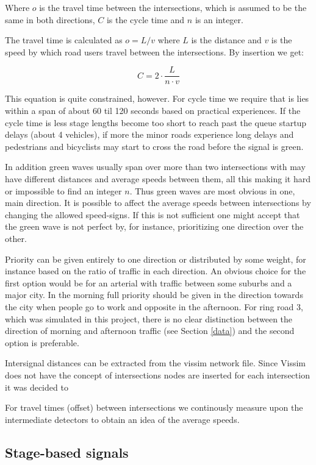 Where $o$ is the travel time between the intersections, which is assumed to be the same in both directions, $C$ is the cycle time and $n$ is an integer.

The travel time is calculated as $o = L / v$ where $L$ is the distance and $v$ is the speed by which road users travel between the intersections. By insertion we get:

$$C = 2 \cdot \frac{L}{n \cdot v}$$

This equation is quite constrained, however. For cycle time we require that is lies within a span of about 60 til 120 seconds based on practical experiences. If the cycle time is less stage lengths become too short to reach past the queue startup delays (about 4 vehicles), if more the minor roads experience long delays and pedestrians and bicyclists may start to cross the road before the signal is green.

In addition green waves usually span over more than two intersections with may have different distances and average speeds between them, all this making it hard or impossible to find an integer $n$. Thus green waves are most obvious in one, main direction. It is possible to affect the average speeds between intersections by changing the allowed speed-signs. If this is not sufficient one might accept that the green wave is not perfect by, for instance, prioritizing one direction over the other.

Priority can be given entirely to one direction or distributed by some weight, for instance based on the ratio of traffic in each direction. An obvious choice for the first option would be for an arterial with traffic between some suburbs and a major city. In the morning full priority should be given in the direction towards the city when people go to work and opposite in the afternoon. For ring road 3, which was simulated in this project, there is no clear distinction between the direction of morning and afternoon traffic (see Section \ref{data}) and the second option is preferable.

Intersignal distances can be extracted from the vissim network file. Since Vissim does not have the concept of intersections nodes are inserted for each intersection it was decided to 

For travel times (offset) between intersections we continously measure upon the intermediate detectors to obtain an idea of the average speeds.

\subsection{Stage-based signals}

